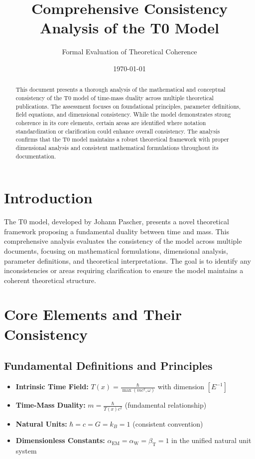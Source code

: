 \documentclass[a4paper,11pt]{article}
\title{Comprehensive Consistency Analysis of the T0 Model}
\author{Formal Evaluation of Theoretical Coherence}
\date{\today}
\newcommand{\Tfield}{T(x)}
\newcommand{\betaT}{\beta_{\text{T}}}
\newcommand{\alphaEM}{\alpha_{\text{EM}}}
\newcommand{\alphaW}{\alpha_{\text{W}}}
\begin{document}
	
	\maketitle
	
	\begin{abstract}
		This document presents a thorough analysis of the mathematical and conceptual consistency of the T0 model of time-mass duality across multiple theoretical publications. The assessment focuses on foundational principles, parameter definitions, field equations, and dimensional consistency. While the model demonstrates strong coherence in its core elements, certain areas are identified where notation standardization or clarification could enhance overall consistency. The analysis confirms that the T0 model maintains a robust theoretical framework with proper dimensional analysis and consistent mathematical formulations throughout its documentation.
	\end{abstract}
	
	\tableofcontents
	
	\section{Introduction}
	
	The T0 model, developed by Johann Pascher, presents a novel theoretical framework proposing a fundamental duality between time and mass. This comprehensive analysis evaluates the consistency of the model across multiple documents, focusing on mathematical formulations, dimensional analysis, parameter definitions, and theoretical interpretations. The goal is to identify any inconsistencies or areas requiring clarification to ensure the model maintains a coherent theoretical structure.
	
	\section{Core Elements and Their Consistency}
	
	\subsection{Fundamental Definitions and Principles}
	
	\begin{tcolorbox}[colback=blue!5!white, colframe=blue!75!black, title=Key Definitions with Strong Consistency]
		\begin{itemize}
			\item \textbf{Intrinsic Time Field:} $\Tfield = \frac{\hbar}{\max(mc^2, \omega)}$ with dimension $[E^{-1}]$
			\item \textbf{Time-Mass Duality:} $m = \frac{\hbar}{\Tfield c^2}$ (fundamental relationship)
			\item \textbf{Natural Units:} $\hbar = c = G = k_B = 1$ (consistent convention)
			\item \textbf{Dimensionless Constants:} $\alphaEM = \alphaW = \betaT = 1$ in the unified natural unit system
		\end{itemize}
	\end{tcolorbox}
	
\end{document}
